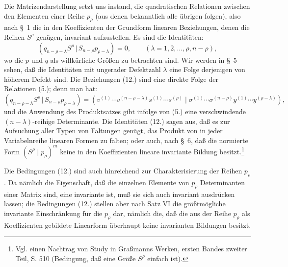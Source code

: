 \documentclass[11pt]{article}
\providecommand{\pair}[2]{(#1\,|\,#2)}
\begin{document}
Die Matrizendarstellung setzt uns instand, die quadratischen Relationen zwischen den Elementen einer Reihe $p_\rho$ (aus denen bekanntlich alle übrigen folgen), also nach \S\ 1 die in den Koeffizienten der Grundform linearen Beziehungen, denen die Reihen $S^\rho$ genügen, invariant aufzustellen. Es sind die Identitäten:
\begin{equation}
 \pair{q_{n-\rho-\lambda}S^\rho}{S_{n-\rho}p_{\rho-\lambda}}=0,
 \qquad (\lambda=1,2,\ldots,\rho,n-\rho),
\tag{12}
\end{equation}
wo die $p$ und $q$ als willkürliche Größen zu betrachten sind. Wir werden in \S\ 5 sehen, daß die Identitäten mit ungerader Defektzahl $\lambda$ eine Folge derjenigen von höherem Defekt sind. Die Beziehungen (12.) sind eine direkte Folge der Relationen (5.); denn man hat:
\[
 \pair{q_{n-\rho-\lambda}S^\rho}{S_{n-\rho}p_{\rho-\lambda}}
 =(v^{(1)}\cdots v^{(n-\rho-\lambda)}s^{(1)}\cdots s^{(\rho)}\mid \sigma^{(1)}\cdots\sigma^{(n-\rho)}y^{(1)}\cdots y^{(\rho-\lambda)}),
\]
und die Anwendung des Produktsatzes gibt infolge von (5.) eine verschwindende $(n-\lambda)$-reihige Determinante. Die Identitäten (12.) sagen aus, daß es zur Aufsuchung aller Typen von Faltungen genügt, das Produkt von in jeder Variabelnreihe linearen Formen zu falten; oder auch, nach \S\ 6, daß die normierte Form $(S^\rho\mid p_\rho)^m$ keine in den Koeffizienten lineare invariante Bildung besitzt.\footnote{Vgl. einen Nachtrag von Study in Graßmanns Werken, ersten Bandes zweiter Teil, S. 510 (Bedingung, daß eine Größe $S^\rho$ einfach ist).}

Die Bedingungen (12.) sind auch hinreichend zur Charakterisierung der Reihen $p_\rho$. Da nämlich die Eigenschaft, daß die einzelnen Elemente von $p_\rho$ Determinanten einer Matrix sind, eine invariante ist, muß sie sich auch invariant ausdrücken lassen; die Bedingungen (12.) stellen aber nach Satz VI die größtmögliche invariante Einschränkung für die $p_\rho$ dar, nämlich die, daß die aus der Reihe $p_\rho$ als Koeffizienten gebildete Linearform überhaupt keine invarianten Bildungen besitzt.
\end{document}
